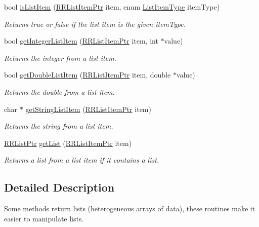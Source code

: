 \begin{DoxyCompactItemize}
bool \hyperlink{group__list_ga8b204dac55a44f35cc1904d5e0972db6}{is\+List\+Item} (\hyperlink{rrc__types_8h_a79938364b69256c42480bb3a29ebf73e}{R\+R\+List\+Item\+Ptr} item, enum \hyperlink{rrc__types_8h_ab99437ab2e88aa90b7ebb8add042b25e}{List\+Item\+Type} item\+Type)
\begin{DoxyCompactList}\small\item\em Returns true or false if the list item is the given item\+Type. \end{DoxyCompactList}\item 
bool \hyperlink{group__list_ga39de89e96a475dc43b7d6653c1b16bb2}{get\+Integer\+List\+Item} (\hyperlink{rrc__types_8h_a79938364b69256c42480bb3a29ebf73e}{R\+R\+List\+Item\+Ptr} item, int $\ast$value)
\begin{DoxyCompactList}\small\item\em Returns the integer from a list item. \end{DoxyCompactList}\item 
bool \hyperlink{group__list_ga70b6de5a951d9fc8f2fff4e725cc2ad8}{get\+Double\+List\+Item} (\hyperlink{rrc__types_8h_a79938364b69256c42480bb3a29ebf73e}{R\+R\+List\+Item\+Ptr} item, double $\ast$value)
\begin{DoxyCompactList}\small\item\em Returns the double from a list item. \end{DoxyCompactList}\item 
char $\ast$ \hyperlink{group__list_ga0af9b5f54fcb61b43650cc756d5d8773}{get\+String\+List\+Item} (\hyperlink{rrc__types_8h_a79938364b69256c42480bb3a29ebf73e}{R\+R\+List\+Item\+Ptr} item)
\begin{DoxyCompactList}\small\item\em Returns the string from a list item. \end{DoxyCompactList}\item 
\hyperlink{rrc__types_8h_a32a8a60ac06858ff3a791672bd2bec73}{R\+R\+List\+Ptr} \hyperlink{group__list_ga062c416b761b13200f28830cf64e3b6c}{get\+List} (\hyperlink{rrc__types_8h_a79938364b69256c42480bb3a29ebf73e}{R\+R\+List\+Item\+Ptr} item)
\begin{DoxyCompactList}\small\item\em Returns a list from a list item if it contains a list. \end{DoxyCompactList}\end{DoxyCompactItemize}


\subsection{Detailed Description}
Some methods return lists (heterogeneous arrays of data), these routines make it easier to manipulate lists. 



